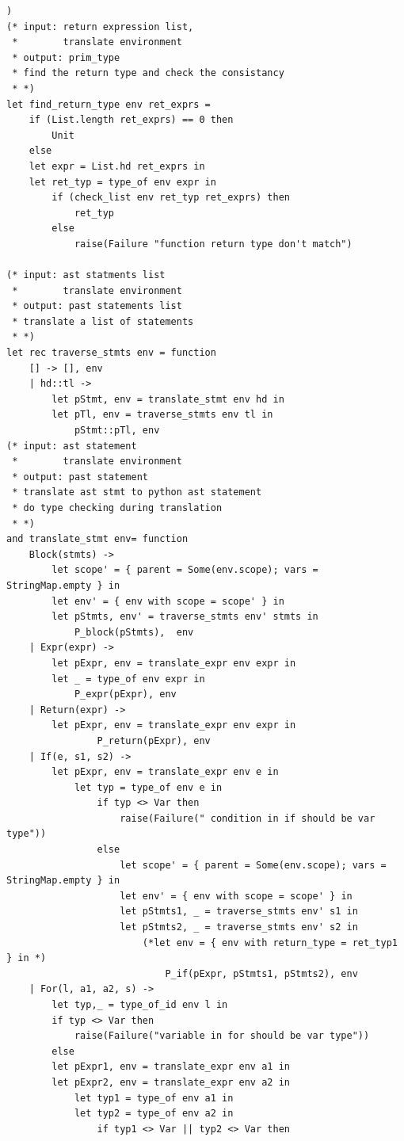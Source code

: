 \documentclass[12pt]{article} %
\begin{document}
\begin{lstlisting}[style=appendix, caption=translate.ml]
                )
(* input: return expression list,
 *        translate environment
 * output: prim_type 
 * find the return type and check the consistancy
 * *)
let find_return_type env ret_exprs =
    if (List.length ret_exprs) == 0 then
        Unit
    else
    let expr = List.hd ret_exprs in
    let ret_typ = type_of env expr in
        if (check_list env ret_typ ret_exprs) then 
            ret_typ
        else
            raise(Failure "function return type don't match")

(* input: ast statments list
 *        translate environment
 * output: past statements list
 * translate a list of statements 
 * *)
let rec traverse_stmts env = function
    [] -> [], env
    | hd::tl -> 
        let pStmt, env = translate_stmt env hd in
        let pTl, env = traverse_stmts env tl in
            pStmt::pTl, env
(* input: ast statement
 *        translate environment
 * output: past statement
 * translate ast stmt to python ast statement 
 * do type checking during translation
 * *)
and translate_stmt env= function
    Block(stmts) ->
        let scope' = { parent = Some(env.scope); vars = StringMap.empty } in
        let env' = { env with scope = scope' } in
        let pStmts, env' = traverse_stmts env' stmts in
            P_block(pStmts),  env 
    | Expr(expr) -> 
        let pExpr, env = translate_expr env expr in
        let _ = type_of env expr in
            P_expr(pExpr), env
    | Return(expr) -> 
        let pExpr, env = translate_expr env expr in
                P_return(pExpr), env 
    | If(e, s1, s2) -> 
        let pExpr, env = translate_expr env e in
            let typ = type_of env e in
                if typ <> Var then
                    raise(Failure(" condition in if should be var type"))
                else
                    let scope' = { parent = Some(env.scope); vars = StringMap.empty } in
                    let env' = { env with scope = scope' } in
                    let pStmts1, _ = traverse_stmts env' s1 in
                    let pStmts2, _ = traverse_stmts env' s2 in
                        (*let env = { env with return_type = ret_typ1 } in *)
                            P_if(pExpr, pStmts1, pStmts2), env  
    | For(l, a1, a2, s) ->
        let typ,_ = type_of_id env l in
        if typ <> Var then
            raise(Failure("variable in for should be var type"))
        else
        let pExpr1, env = translate_expr env a1 in
        let pExpr2, env = translate_expr env a2 in
            let typ1 = type_of env a1 in
            let typ2 = type_of env a2 in
                if typ1 <> Var || typ2 <> Var then

\end{lstlisting}
\end{document}
